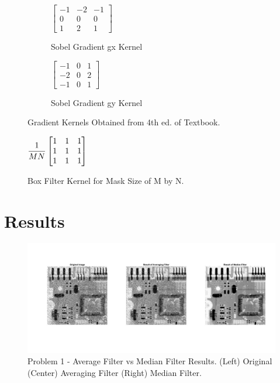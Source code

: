\documentclass[./rarnold_report3.tex]{subfiles}
\begin{document}
\begin{figure}[!htbp]
	\centering
	\begin{subfigure}{0.5\textwidth}
	\centering
	$\begin{bmatrix}
	-1 & -2 & -1 \\
	0 & 0 & 0 \\
	1 & 2 & 1
	\end{bmatrix}$
	\caption{Sobel Gradient gx Kernel}
	\label{sobel_x}
	\end{subfigure}%
	\begin{subfigure}{0.5\textwidth}
	\centering
	$\begin{bmatrix}
	-1 & 0 & 1 \\
	-2 & 0 & 2 \\
	-1 & 0 & 1
	\end{bmatrix}$
	\caption{Sobel Gradient gy Kernel}
	\label{sobel_y}
	\end{subfigure}
	\caption{Gradient Kernels Obtained from 4th ed. of Textbook.}
	\label{sobels}
\end{figure}

\begin{figure}[!htbp]
\centering
$\mathlarger{\frac{1}{MN}} 
\begin{bmatrix}
1 & 1 & 1 \\
1 & 1 & 1 \\
1 & 1 & 1
\end{bmatrix}$
\caption{Box Filter Kernel for Mask Size of M by N.}
\label{box_kernel}
\end{figure}

\clearpage

\section*{Results}
  	
  	\begin{figure}[!htbp]
	\centering
	\includegraphics[scale=0.40]{"avg_median"}
	\captionsetup{justification=centering}
	\caption{Problem 1 - Average Filter vs Median Filter Results. (Left) Original (Center) Averaging Filter (Right) Median Filter.} 
	\label{salt_and_pepper}
	\end{figure}
	
\end{document}
